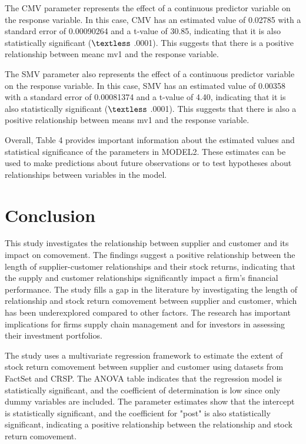\documentclass[12pt,english]{article}
\begin{document}
The CMV parameter represents the effect of a continuous predictor variable on the response variable. In this case, CMV has an estimated value of 0.02785 with a standard error of 0.00090264 and a t-value of 30.85, indicating that it is also statistically significant ($\textless$ .0001). This suggests that there is a positive relationship between meanc mv1 and the response variable.

The SMV parameter also represents the effect of a continuous predictor variable on the response variable. In this case, SMV has an estimated value of 0.00358 with a standard error of 0.00081374 and a t-value of 4.40, indicating that it is also statistically significant ($\textless$ .0001). This suggests that there is also a positive relationship between means mv1 and the response variable.

Overall, Table 4 provides important information about the estimated values and statistical significance of the parameters in MODEL2. These estimates can be used to make predictions about future observations or to test hypotheses about relationships between variables in the model.


\section{Conclusion}\label{sec:conclusion}


This study investigates the relationship between supplier and customer and its impact on comovement. The findings suggest a positive relationship between the length of supplier-customer relationships and their stock returns, indicating that the supply and customer relationships significantly impact a firm's financial performance. The study fills a gap in the literature by investigating the length of relationship and stock return comovement between supplier and customer, which has been underexplored compared to other factors. The research has important implications for firms supply chain management and for investors in assessing their investment portfolios.

The study uses a multivariate regression framework to estimate the extent of stock return comovement between supplier and customer using datasets from FactSet and CRSP. The ANOVA table indicates that the regression model is statistically significant, and the coefficient of determination is low since only dummy variables are included. The parameter estimates show that the intercept is statistically significant, and the coefficient for "post" is also statistically significant, indicating a positive relationship between the relationship and stock return comovement.
\end{document}

